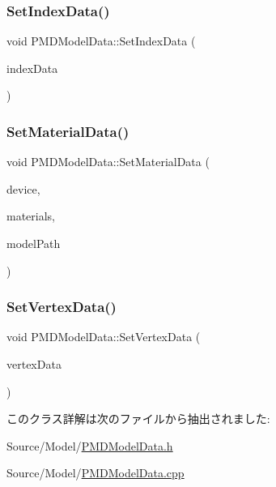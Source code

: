 \mbox{\label{class_p_m_d_model_data_a120b4a461669a4bb68210602b17425f1}} 
\subsubsection{\texorpdfstring{Set\+Index\+Data()}{SetIndexData()}}
{\footnotesize\ttfamily void P\+M\+D\+Model\+Data\+::\+Set\+Index\+Data (\begin{DoxyParamCaption}\item[{const std\+::vector$<$ unsigned short $>$ \&}]{index\+Data }\end{DoxyParamCaption})}

\mbox{\label{class_p_m_d_model_data_a83a950e111380bb2a28ecab045e5c3b4}} 
\subsubsection{\texorpdfstring{Set\+Material\+Data()}{SetMaterialData()}}
{\footnotesize\ttfamily void P\+M\+D\+Model\+Data\+::\+Set\+Material\+Data (\begin{DoxyParamCaption}\item[{std\+::shared\+\_\+ptr$<$ \mbox{\hyperlink{class_device}{Device}} $>$}]{device,  }\item[{const std\+::vector$<$ \mbox{\hyperlink{struct_p_m_d_material}{P\+M\+D\+Material}} $>$ \&}]{materials,  }\item[{const std\+::string \&}]{model\+Path }\end{DoxyParamCaption})}

\mbox{\label{class_p_m_d_model_data_a7c3e55a09f65738c2117bdd7bb71b058}} 
\subsubsection{\texorpdfstring{Set\+Vertex\+Data()}{SetVertexData()}}
{\footnotesize\ttfamily void P\+M\+D\+Model\+Data\+::\+Set\+Vertex\+Data (\begin{DoxyParamCaption}\item[{const std\+::vector$<$ \mbox{\hyperlink{struct_p_m_d_vertex}{P\+M\+D\+Vertex}} $>$ \&}]{vertex\+Data }\end{DoxyParamCaption})}



このクラス詳解は次のファイルから抽出されました\+:\begin{DoxyCompactItemize}
\item 
Source/\+Model/\mbox{\hyperlink{_p_m_d_model_data_8h}{P\+M\+D\+Model\+Data.\+h}}\item 
Source/\+Model/\mbox{\hyperlink{_p_m_d_model_data_8cpp}{P\+M\+D\+Model\+Data.\+cpp}}\end{DoxyCompactItemize}
